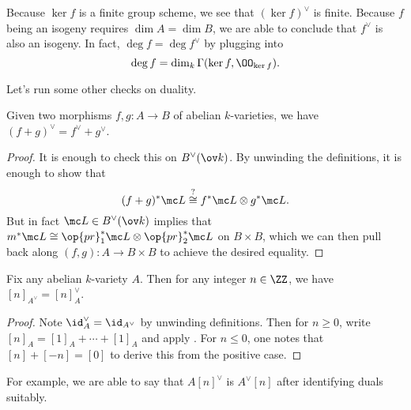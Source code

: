 \documentclass[../notes.tex]{subfiles}
\begin{document}
\begin{remark}
	Because $\ker f$ is a finite group scheme, we see that $(\ker f)^\lor$ is finite. Because $f$ being an isogeny requires $\dim A=\dim B$, we are able to conclude that $f^\lor$ is also an isogeny. In fact, $\deg f=\deg f^\lor$ by plugging  into
	\[\deg f=\dim_k\Gamma(\ker f,\OO_{\ker f}).\]
\end{remark}
Let's run some other checks on duality.
\begin{proposition} \label{prop:add-duals}
	Given two morphisms $f,g\colon A\to B$ of abelian $k$-varieties, we have $(f+g)^\lor=f^\lor+g^\lor$.
\end{proposition}
\begin{proof}
	It is enough to check this on $B^\lor(\ov k)$. By unwinding the definitions, it is enough to show that
	\[(f+g)^*\mc L\stackrel?\cong f^*\mc L\otimes g^*\mc L.\]
	But in fact $\mc L\in B^\lor(\ov k)$ implies that $m^*\mc L\cong\op{pr}_1^*\mc L\otimes\op{pr}_2^*\mc L$ on $B\times B$, which we can then pull back along $(f,g)\colon A\to B\times B$ to achieve the desired equality.
\end{proof}
\begin{corollary}
	Fix any abelian $k$-variety $A$. Then for any integer $n\in\ZZ$, we have $[n]_{A^\lor}=[n]_A^\lor$.
\end{corollary}
\begin{proof}
	Note ${\id_A^\lor}=\id_{A^\lor}$ by unwinding definitions. Then for $n\ge0$, write $[n]_A=[1]_A+\cdots+[1]_A$ and apply . For $n\le0$, one notes that $[n]+[-n]=[0]$ to derive this from the positive case.
\end{proof}
\begin{remark}
	For example, we are able to say that $A[n]^\lor$ is $A^\lor[n]$ after identifying duals suitably.
\end{remark}
\end{document}
